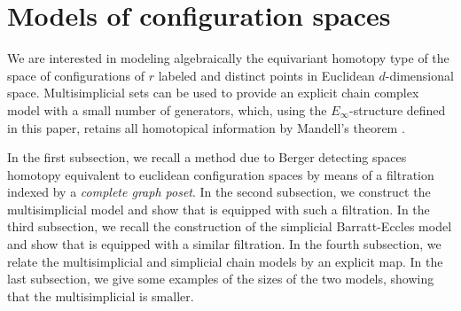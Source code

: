 
\section{Models of configuration spaces}

We are interested in modeling algebraically the equivariant homotopy type of the space of configurations of $r$ labeled and distinct points in Euclidean $d$-dimensional space.
Multisimplicial sets can be used to provide an explicit chain complex model with a small number of generators, which, using the $E_\infty$-structure defined in this paper, retains all homotopical information by Mandell's theorem \cite{mandell2006homotopy_type}.

In the first subsection, we recall a method due to Berger detecting spaces homotopy equivalent to euclidean configuration spaces by means of a filtration indexed by a {\em complete graph poset}.
In the second subsection, we construct the multisimplicial model and show that is equipped with such a filtration.
In the third subsection, we recall the construction of the simplicial Barratt-Eccles model and show that is equipped with a similar filtration.
In the fourth subsection, we relate the multisimplicial and simplicial chain models by an explicit map. In the last subsection, we give some examples of the sizes of the two models, showing that the multisimplicial is smaller.






